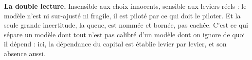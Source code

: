 \vspace{2pt}


\begin{cle}
\textbf{La double lecture.} \og Insensible aux choix innocents, sensible aux leviers réels \fg :
le modèle n'est ni sur-ajusté ni fragile, il est piloté par ce qui doit le piloter.
Et la seule grande incertitude, la queue, est nommée et bornée, pas cachée. C'est ce qui
sépare un modèle dont tout n'est pas calibré d'un modèle dont on ignore de quoi il dépend :
ici, la dépendance du capital est établie levier par levier, et son absence aussi.
\end{cle}

